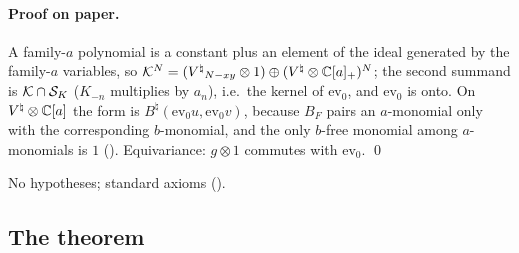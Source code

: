 \paragraph{Proof on paper.}  A family-$a$ polynomial is a constant plus an element of the ideal generated by
the family-$a$ variables, so $\mathcal{K}^N=({V^{\natural}}_{N-xy}\otimes1)\oplus({V^{\natural}}\otimes\mathbb C[a]_+)^N$; the second summand is
$\mathcal{K}\cap\mathcal{S}_K$ ($K_{-n}$ multiplies by $a_n$), i.e.\ the kernel of $\mathrm{ev}_0$, and $\mathrm{ev}_0$ is onto. On
${V^{\natural}}\otimes\mathbb C[a]$ the form is $B^\natural(\mathrm{ev}_0u,\mathrm{ev}_0v)$, because $B_F$ pairs an $a$-monomial only with the
corresponding $b$-monomial, and the only $b$-free monomial among $a$-monomials is $1$
().  Equivariance: $g\otimes1$ commutes with $\mathrm{ev}_0$. \qed
\begin{status}No hypotheses; standard axioms ().\end{status}

\subsection{The theorem}

